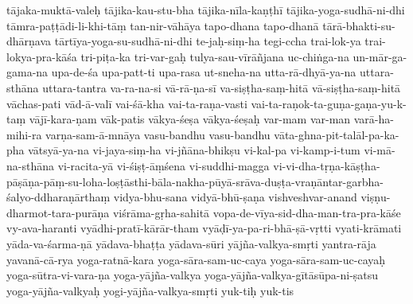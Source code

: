 {{tājaka-muktā-valeḥ
tājika-kau-stu-bha
tājika-nīla-kaṇṭhī
tājika-yoga-sudhā-ni-dhi
tāmra-paṭṭādi-li-khi-tāṃ
tan-nir-vāhāya
tapo-dhana
tapo-dhanā
tārā-bhakti-su-dhārṇava
tārtīya-yoga-su-sudhā-ni-dhi
te-jaḥ-siṃ-ha
tegi-ccha
trai-lok-ya
trai-lokya-pra-kāśa
tri-piṭa-ka
tri-var-gaḥ
tulya-sau-vīrāñjana
uc-chiṅga-na
un-mār-ga-gama-na
upa-de-śa
upa-patt-ti
upa-rasa
ut-sneha-na
utta-rā-dhyā-ya-na
uttara-sthāna
uttara-tantra
va-ra-na-si
vā-rā-ṇa-sī
va-siṣṭha-saṃ-hitā
vā-siṣṭha-saṃ-hitā
vāchas-pati
vād-ā-valī
vai-śā-kha
vai-ta-raṇa-vasti
vai-ta-raṇok-ta-guṇa-gaṇa-yu-k-taṃ
vājī-kara-ṇam
vāk-patis
vākya-śeṣa
vākya-śeṣaḥ
var-mam
var-man
varā-ha-mihi-ra
varṇa-sam-ā-mnāya
vasu-bandhu
vasu-bandhu
vāta-ghna-pit-talāl-pa-ka-pha
vātsyā-ya-na
vi-jaya-siṃ-ha
vi-jñāna-bhikṣu
vi-kal-pa
vi-kamp-i-tum
vi-mā-na-sthāna
vi-racita-yā
vi-śiṣṭ-āṃśena
vi-suddhi-magga
vi-vi-dha-tṛṇa-kāṣṭha-pāṣāṇa-pāṃ-su-loha-loṣṭāsthi-bāla-nakha-pūyā-srāva-duṣṭa-vraṇāntar-garbha-śalyo-ddharaṇārthaṃ
vidya-bhu-sana
vidyā-bhū-ṣaṇa
vishveshvar-anand
viṣṇu-dharmot-tara-purāṇa
viśrāma-gṛha-sahitā
vopa-de-vīya-sid-dha-man-tra-pra-kāśe
vy-ava-haranti
vyādhi-pratī-kārār-tham
vyāḍī-ya-pa-ri-bhā-ṣā-vṛtti
vyati-krāmati
yāda-va-śarma-ṇā
yādava-bhaṭṭa
yādava-sūri
yājña-valkya-smṛti
yantra-rāja
yavanā-cā-rya
yoga-ratnā-kara
yoga-sāra-sam-uc-caya
yoga-sāra-sam-uc-cayaḥ
yoga-sūtra-vi-vara-ṇa
yoga-yājña-valkya
yoga-yājña-valkya-gītāsūpa-ni-ṣatsu
yoga-yājña-valkyaḥ
yogi-yājña-valkya-smṛti
yuk-tiḥ
yuk-tis
}}
\normalfontlatin %
\endinput
